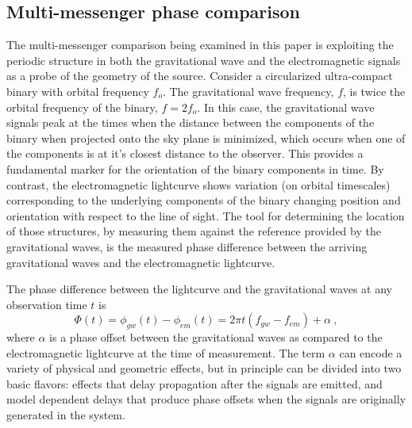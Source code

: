 \documentclass[preprint2]{aastex}
\begin{document}
\subsection{Multi-messenger phase comparison}\label{sub.emGWphase}
The multi-messenger comparison being examined in this paper is
exploiting the periodic structure in both the gravitational wave and
the electromagnetic signals as a probe of the geometry of the source.
Consider a circularized ultra-compact binary with orbital frequency
$f_{o}$.  The gravitational wave frequency, $f$, is twice the orbital
frequency of the binary, $f = 2 f_{o}$.  In this case, the
gravitational wave signals peak at the times when the distance between the components of
the binary when projected onto the sky plane is minimized, which occurs when one of the components is at it's closest distance to the observer. This provides a fundamental marker for the
orientation of the binary components in time.  By contrast, the
electromagnetic lightcurve shows variation (on orbital timescales)
corresponding to the underlying components of the binary changing
position and orientation with respect to the line of sight.  The tool
for determining the location of those structures, by measuring them
against the reference provided by the gravitational waves, is the
measured phase difference between the arriving gravitational waves and
the electromagnetic lightcurve.

The phase difference between the lightcurve and the gravitational 
waves at any observation time $t$ is
\begin{equation}
    \Phi(t) = \phi_{gw}(t) - \phi_{em}(t) = 2\pi t(f_{gw}-f_{em}) + 
    \alpha \ ,
    \label{eqn.phaseDifference}
\end{equation}
where $\alpha$ is a phase offset between the gravitational waves as
compared to the electromagnetic lightcurve at the time of
measurement.  The term $\alpha$ can encode a variety of physical and
geometric effects, but in principle can be divided into two basic 
flavors: effects that delay propagation after the signals are 
emitted, and model dependent delays that produce phase offsets when 
the signals are originally generated in the system.
\end{document}
